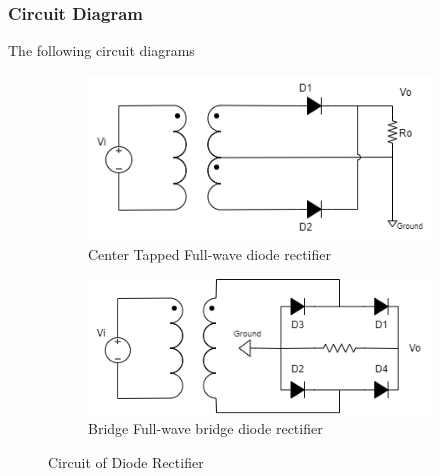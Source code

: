     \subsubsection{Circuit Diagram}
        The following circuit diagrams 
        \begin{figure}[H]
            \centering
            \begin{subfigure}{0.6\textwidth}
                \includegraphics[width=1\linewidth]{Experiment_03/Circuits/Lab3a.png}
                \caption{Center Tapped Full-wave diode rectifier}
                \label{cir:3a}
            \end{subfigure}

            \begin{subfigure}{0.6\textwidth}
                \includegraphics[width=1\linewidth]{Experiment_03/Circuits/Lab3b.png}
                \caption{Bridge Full-wave bridge diode rectifier}
                \label{cir:3b}
            \end{subfigure}
            \caption{Circuit of Diode Rectifier}
        \end{figure}

